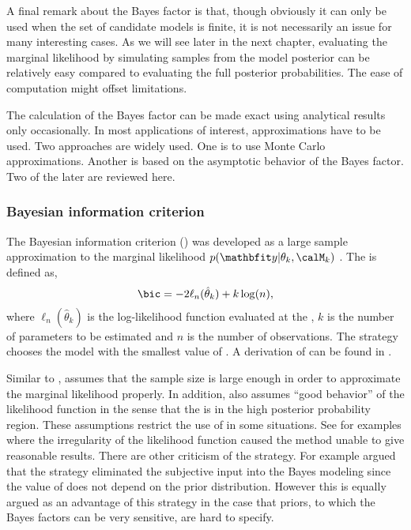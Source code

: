 

A final remark about the Bayes factor is that, though obviously it can only be used when the set of candidate models is finite, it is not necessarily an issue for many interesting cases. As we will see later in the next chapter, evaluating the marginal likelihood by simulating samples from the model posterior can be relatively easy compared to evaluating the full posterior probabilities. The ease of computation might offset limitations.

The calculation of the Bayes factor can be made exact using analytical results only occasionally. In most applications of interest, approximations have to be used. Two approaches are widely used. One is to use Monte Carlo approximations. Another is based on the asymptotic behavior of the Bayes factor. Two of the later are reviewed here.

\subsubsection{Bayesian information criterion}
\label{ssub:Bayesian information criteria}

The Bayesian information criterion (\bic) was developed as a large sample approximation to the marginal likelihood $p(\data|\theta_k,\calM_k)$ \cite{Schwarz:1978uv}. The \bic is defined as,
\begin{equation}
  \text{\bic} = -2\ell_n(\hat\theta_k) + k\log(n),
  \label{eq:bic}
\end{equation}
where $\ell_n(\hat\theta_k)$ is the log-likelihood function evaluated at the \mle, $k$ is the number of parameters to be estimated and $n$ is the number of observations. The \bic strategy chooses the model with the smallest value of \bic. A derivation of \bic can be found in \cite[][sec.~3.2]{Claeskens:2008tq}.

Similar to \aic, \bic assumes that the sample size is large enough in order to approximate the marginal likelihood properly. In addition, \bic also assumes ``good behavior'' of the likelihood function in the sense that the \mle is in the high posterior probability region. These assumptions restrict the use of \bic in some situations. See \cite{Berger:2001uy} for examples where the irregularity of the likelihood function caused the \bic method unable to give reasonable results. There are other criticism of the \bic strategy. For example \cite[][sec.~7.2.3]{Robert:2007tc} argued that the \bic strategy eliminated the subjective input into the Bayes modeling since the value of \bic does not depend on the prior distribution. However this is equally argued as an advantage of this strategy in the case that priors, to which the Bayes factors can be very sensitive, are hard to specify.

